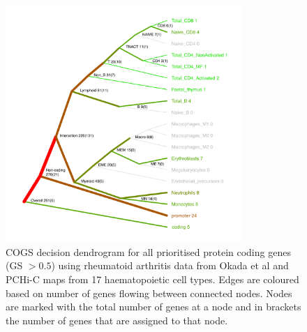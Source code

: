 \documentclass[a4paper,11pt]{report}
\begin{document}
\begin{figure}[ht]
\centering
\includegraphics[width=0.8\textwidth]{RA_dend.pdf}
\caption{COGS decision dendrogram for all prioritised protein coding genes (GS $> 0.5$) using rheumatoid arthritis data from Okada et al and PCHi-C maps from 17 haematopoietic cell types. Edges are coloured based on number of genes flowing between connected nodes. Nodes are marked with the total number of genes at a node and in brackets the number of genes that are assigned to that node.}
\label{fig:RA_dend}
\end{figure}

 
\end{document}
